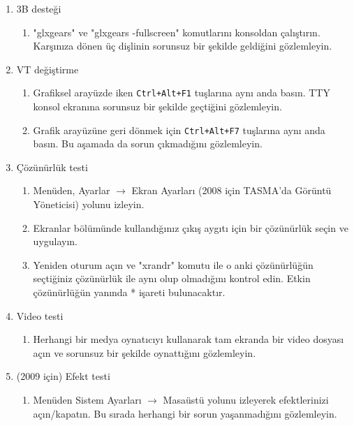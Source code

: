 \documentclass[a4paper,10pt]{article}
\begin{document}
\begin{itemize}
\begin{enumerate}
  \item 3B desteği
    \begin{enumerate}
    \item "glxgears" ve "glxgears -fullscreen" komutlarını konsoldan çalıştırın. Karşınıza dönen üç dişlinin sorunsuz bir şekilde geldiğini gözlemleyin.
    \end{enumerate}

  \item VT değiştirme
    \begin{enumerate}
    \item Grafiksel arayüzde iken \texttt{Ctrl+Alt+F1} tuşlarına aynı anda basın. TTY konsol ekranına sorunsuz bir şekilde geçtiğini gözlemleyin.
    \item Grafik arayüzüne geri dönmek için \texttt{Ctrl+Alt+F7} tuşlarına aynı anda basın. Bu aşamada da sorun çıkmadığını gözlemleyin.
    \end{enumerate}

  \item Çözünürlük testi
    \begin{enumerate}
    \item Menüden, Ayarlar $\rightarrow$ Ekran Ayarları (2008 için TASMA'da Görüntü Yöneticisi) yolunu izleyin.
    \item Ekranlar bölümünde kullandığınız çıkış aygıtı için bir çözünürlük seçin ve uygulayın.
    \item Yeniden oturum açın ve "xrandr" komutu ile o anki çözünürlüğün seçtiğiniz çözünürlük
          ile aynı olup olmadığını kontrol edin. Etkin çözünürlüğün yanında * işareti bulunacaktır.
    \end{enumerate}
 
  \item Video testi
    \begin{enumerate}
    \item Herhangi bir medya oynatıcıyı kullanarak tam ekranda bir video dosyası açın ve sorunsuz bir şekilde oynattığını gözlemleyin.
    \end{enumerate}
 
  \item (2009 için) Efekt testi
    \begin{enumerate}
    \item Menüden Sistem Ayarları $\rightarrow$ Masaüstü yolunu izleyerek efektlerinizi açın/kapatın. Bu sırada herhangi bir sorun yaşanmadığını gözlemleyin.
    \end{enumerate}
  \end{enumerate}
\end{itemize}
\end{document}
